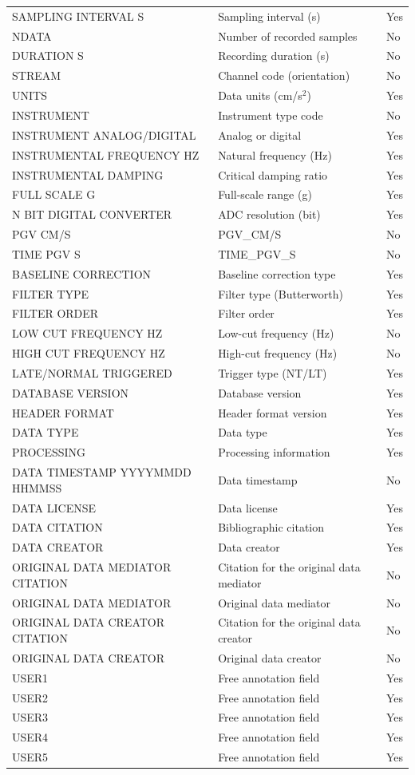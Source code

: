 \begin{longtable}{
  >{\raggedright\arraybackslash}p{4cm}  >{\raggedright\arraybackslash}p{8cm}  >{\centering\arraybackslash}p{2cm}
}
SAMPLING INTERVAL S & Sampling interval (s) & Yes \\
NDATA & Number of recorded samples & No \\
DURATION S & Recording duration (s) & No \\
STREAM & Channel code (orientation) & No \\
UNITS & Data units (cm/s$^2$) & Yes \\
INSTRUMENT & Instrument type code & No \\
INSTRUMENT ANALOG/DIGITAL & Analog or digital & Yes \\
INSTRUMENTAL FREQUENCY HZ & Natural frequency (Hz) & Yes \\
INSTRUMENTAL DAMPING & Critical damping ratio & Yes \\
FULL SCALE G & Full-scale range (g) & Yes \\
N BIT DIGITAL CONVERTER & ADC resolution (bit) & Yes \\
PGV CM/S & PGV_CM/S & No \\
TIME PGV S & TIME_PGV_S & No \\
BASELINE CORRECTION & Baseline correction type & Yes \\
FILTER TYPE & Filter type (Butterworth) & Yes \\
FILTER ORDER & Filter order & Yes \\
LOW CUT FREQUENCY HZ & Low-cut frequency (Hz) & No \\
HIGH CUT FREQUENCY HZ & High-cut frequency (Hz) & No \\
LATE/NORMAL TRIGGERED & Trigger type (NT/LT) & Yes \\
DATABASE VERSION & Database version & Yes \\
HEADER FORMAT & Header format version & Yes \\
DATA TYPE & Data type & Yes \\
PROCESSING & Processing information & Yes \\
DATA TIMESTAMP YYYYMMDD HHMMSS & Data timestamp & No \\
DATA LICENSE & Data license & Yes \\
DATA CITATION & Bibliographic citation & Yes \\
DATA CREATOR & Data creator & Yes \\
ORIGINAL DATA MEDIATOR CITATION & Citation for the original data mediator & No \\
ORIGINAL DATA MEDIATOR & Original data mediator & No \\
ORIGINAL DATA CREATOR CITATION & Citation for the original data creator & No \\
ORIGINAL DATA CREATOR & Original data creator & No \\
USER1 & Free annotation field & Yes \\
USER2 & Free annotation field & Yes \\
USER3 & Free annotation field & Yes \\
USER4 & Free annotation field & Yes \\
USER5 & Free annotation field & Yes \\
\end{longtable}
